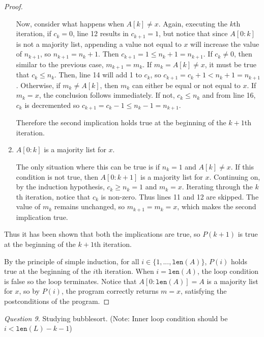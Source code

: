 \documentclass[11pt]{article}
\begin{document}
\begin{proof}
\begin{enumerate}
            Now, consider what happens when \(A[k]\neq x\). Again, executing the \(k\)th iteration, if \(c_k = 0\), line 12 results in \(c_{k+1} = 1\), but notice that since \(A[0:k]\) is not a majority list, appending a value not equal to \(x\) will increase the value of \(n_{k+1}\), so \(n_{k+1} = n_k + 1\). Then \(c_{k+1} = 1 \leq n_k + 1 = n_{k+1}\). If \(c_k \neq 0\), then similar to the previous case, \(m_{k+1} = m_k\). If \(m_k = A[k] \neq x\), it must be true that \(c_k \leq n_k\). Then, line 14 will add 1 to \(c_k\), so \(c_{k+1} = c_k + 1 < n_k + 1 = n_{k+1}\). Otherwise, if \(m_k \neq A[k]\), then \(m_k\) can either be equal or not equal to \(x\). If \(m_k = x\), the conclusion follows immediately. If not, \(c_k \leq n_k\) and from line 16, \(c_k\) is decremented so \(c_{k+1} = c_k - 1 \leq n_k - 1 = n_{k+1}\).

            Therefore the second implication holds true at the beginning of the \(k+1\)th iteration.

            \item \(A[0:k]\) is a majority list for \(x\).
            
            The only situation where this can be true is if \(n_k = 1\) and \(A[k] \neq x\). If this condition is not true, then \(A[0:k+1]\) is a majority list for \(x\). Continuing on, by the induction hypothesis, \(c_k \geq n_k = 1\) and \(m_k = x\). Iterating through the \(k\)th iteration, notice that \(c_k\) is non-zero. Thus lines 11 and 12 are skipped. The value of \(m_k\) remains unchanged, so \(m_{k+1} = m_k = x\), which makes the second implication true.
        \end{enumerate}
        Thus it has been shown that both the implications are true, so \(P(k+1)\) is true at the beginning of the \(k+1\)th iteration.

        By the principle of simple induction, for all \(i \in \{1,...,\texttt{len}(A)\}\), \(P(i)\) holds true at the beginning of the \(i\)th iteration. When \(i = \texttt{len}(A)\), the loop condition is false so the loop terminates. Notice that \(A[0:\texttt{len}(A)] = A\) is a majority list for \(x\), so by \(P(i)\), the program correctly returns \(m = x\), satisfying the postconditions of the program.
        
    \end{proof}
    \textit{Question 9.} Studying bubblesort. (Note: Inner loop condition should be \(i < \texttt{len}(L) -k-1\))
\end{document}
